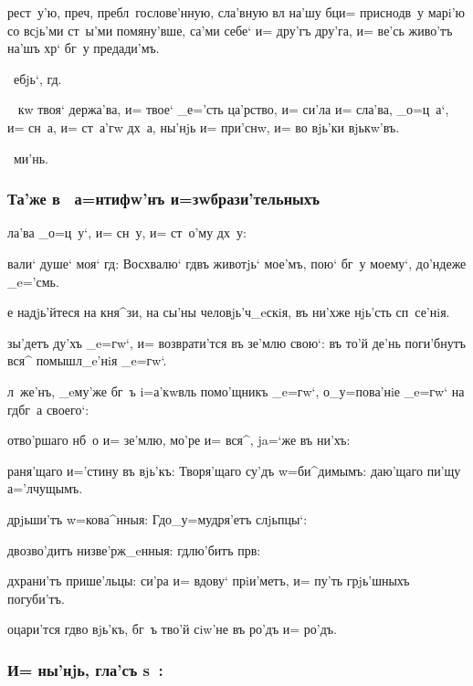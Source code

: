 \documentclass[12pt,twoside,a6paper,dvips,civil=antiqua,cs=izhitsa]{hipbook}
\newcommand{\xpref}[1]{\rem{#1:}\ }
\newcommand{\lik}{\rem{Ли'къ:}\ }
\renewcommand{\*}{~~\raise3pt\hbox{\footnotesize*}}
\begin{document}
{{рест~у'ю, преч, пребл~гослове'нную, сла'вную вл
на'шу бц и= приснодв~у марi'ю со всjь'ми ст~ы'ми помяну'вше, са'ми
себе` и= дру'гъ дру'га, и= ве'сь живо'тъ на'шъ хр` бг~у
предади'мъ.

\lik{ебjь`, гд.}

\xpref{\bukv{В}о'згласъ} кw твоя` держа'ва, и= твое`
_е='сть ца'рство, и= си'ла и= сла'ва, _о=ц~а`, и= сн~а, и= ст~а'гw
дх~а, ны'нjь и= при'снw, и= во вjь'ки вjькw'въ.

\lik{ми'нь.}

\subsubsection{Та'же в~ а=нтифw'нъ и=зwбрази'тельныхъ}

ла'ва _о=ц~у`, и= сн~у, и= ст~о'му дх~у:

{\large{}вали` душе` моя` гд: Восхвалю` гд въ животjь`
  мое'мъ, пою` бг~у моему`, до'ндеже _e='смь.\par}

{\large{}е надjь'йтеся на кня^зи, на сы'ны человjь'ч_eскiя, въ
  ни'хже нjь'сть сп~се'нiя.\par}

{\large{}зы'детъ ду'хъ _e=гw`, и= возврати'тся въ зе'млю свою`:
  въ то'й де'нь поги'бнутъ вся^ помышл_e'нiя _e=гw`.\par}

л~же'нъ, _eму'же бг~ъ i=а'кwвль помо'щникъ _e=гw`,
о_у=пова'нiе _e=гw` на гд бг~а своего`:

отво'ршаго нб~о и= зе'млю, мо'ре и= вся^, ja=`же въ ни'хъ:

раня'щаго и='стину въ вjь'къ: Творя'щаго су'дъ w=би^димымъ:
даю'щаго пи'щу а='лчущымъ.

д рjьши'тъ w=кова^нныя: Гд о_у=мудря'етъ слjьпцы`:

д возво'дитъ низве'рж_eнныя: гд лю'битъ прв:

д храни'тъ прише'льцы: си'ра и= вдову` прiи'метъ, и= пу'ть грjь'шныхъ погуби'тъ.

{\large{}оцари'тся гд во вjь'къ, бг~ъ тво'й сiw'не въ ро'дъ
  и= ро'дъ.\par}

\subsubsection{И= ны'нjь, гла'съ s~:}

}}
\end{document}
